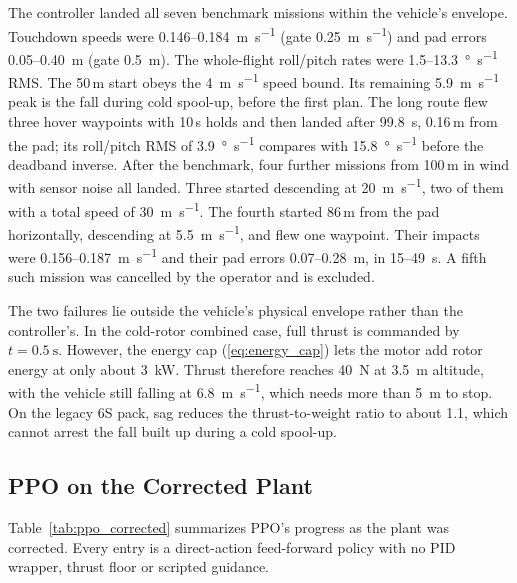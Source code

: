 \documentclass[conference]{IEEEtran}
\begin{document}
The controller landed all seven benchmark missions within the vehicle's envelope. Touchdown speeds were 0.146--\SI{0.184}{\metre\per\second} (gate \SI{0.25}{\metre\per\second}) and pad errors 0.05--\SI{0.40}{\metre} (gate \SI{0.5}{\metre}). The whole-flight roll/pitch rates were 1.5--\SI{13.3}{\degree\per\second} RMS. The 50\,m start obeys the \SI{4}{\metre\per\second} speed bound. Its remaining \SI{5.9}{\metre\per\second} peak is the fall during cold spool-up, before the first plan. The long route flew three hover waypoints with 10\,s holds and then landed after \SI{99.8}{\second}, 0.16\,m from the pad; its roll/pitch RMS of \SI{3.9}{\degree\per\second} compares with \SI{15.8}{\degree\per\second} before the deadband inverse. After the benchmark, four further missions from 100\,m in wind with sensor noise all landed. Three started descending at \SI{20}{\metre\per\second}, two of them with a total speed of \SI{30}{\metre\per\second}. The fourth started 86\,m from the pad horizontally, descending at \SI{5.5}{\metre\per\second}, and flew one waypoint. Their impacts were 0.156--\SI{0.187}{\metre\per\second} and their pad errors 0.07--\SI{0.28}{\metre}, in 15--\SI{49}{\second}. A fifth such mission was cancelled by the operator and is excluded.

The two failures lie outside the vehicle's physical envelope rather than the controller's. In the cold-rotor combined case, full thrust is commanded by $t = \SI{0.5}{\second}$. However, the energy cap (\ref{eq:energy_cap}) lets the motor add rotor energy at only about \SI{3}{\kilo\watt}. Thrust therefore reaches \SI{40}{\newton} at \SI{3.5}{\metre} altitude, with the vehicle still falling at \SI{6.8}{\metre\per\second}, which needs more than \SI{5}{\metre} to stop. On the legacy 6S pack, sag reduces the thrust-to-weight ratio to about 1.1, which cannot arrest the fall built up during a cold spool-up.

\subsection{PPO on the Corrected Plant}
\label{sec:ppo_corrected}

Table~\ref{tab:ppo_corrected} summarizes PPO's progress as the plant was corrected. Every entry is a direct-action feed-forward policy with no PID wrapper, thrust floor or scripted guidance.
\end{document}
